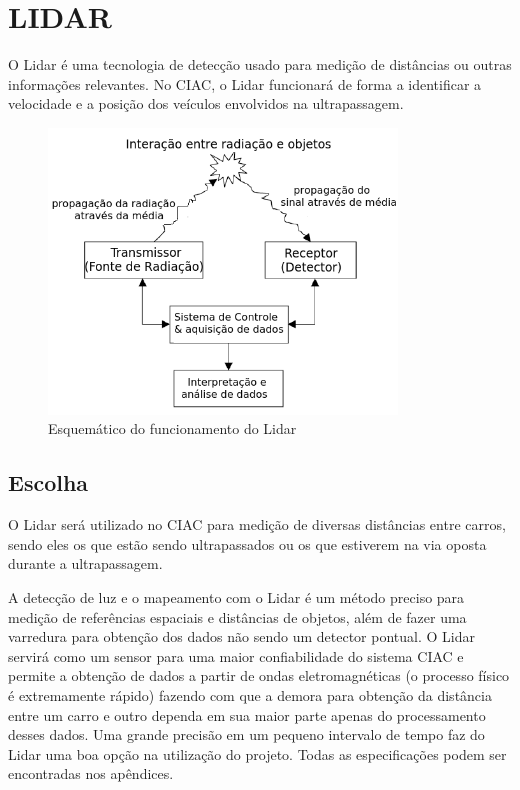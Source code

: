 \section{LIDAR}

O Lidar é uma tecnologia de detecção usado para medição de distâncias ou outras informações relevantes. No CIAC, o Lidar funcionará de forma a identificar a velocidade e a posição dos veículos envolvidos na ultrapassagem.

\begin{figure}[h]
  \centering
  \includegraphics[width=350px, scale=1]{figuras/funcionamento_lidar}
  \caption{Esquemático do funcionamento do Lidar}
\label{fig:funcionamento_lidar}
\end{figure}


\subsection{Escolha}

O Lidar será utilizado no CIAC para medição de diversas distâncias entre carros, sendo eles os que estão sendo ultrapassados ou os que estiverem na via oposta durante a ultrapassagem.

A detecção de luz e o mapeamento com o Lidar é um método preciso para medição de referências espaciais e distâncias de objetos, além de fazer uma varredura para obtenção dos dados não sendo um detector pontual. O Lidar servirá como um sensor para uma maior confiabilidade do sistema CIAC e permite a obtenção de dados a partir de ondas eletromagnéticas (o processo físico é extremamente rápido) fazendo com que a demora para obtenção da distância entre um carro e outro dependa em sua maior parte apenas do processamento desses dados. Uma grande precisão em um pequeno intervalo de tempo faz do Lidar uma boa opção na utilização do projeto. Todas as especificações podem ser encontradas nos apêndices.

